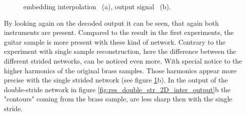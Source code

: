 \begin{figure}[htb!]
    \centering
    \caption{embedding interpolation ~(a), output signal ~(b).}
    \label{fig:res_single_str_2D_inter_output}
\end{figure}

By looking again on the decoded output it can be seen, that again both instruments are present. Compared to the result in the first experiments, the guitar sample is more present with these kind of network. Contrary to the experiment with single sample reconstruction, here the difference between the different strided networks, can be noticed even more. With special notice to the higher harmonics of the original brass samples. Those harmonics appear more precise with the single strided network (see figure \ref{fig:res_single_str_2D_inter_output}b). In the output of the double-stride network in figure \ref{fig:res_double_str_2D_inter_output}b the "contours" coming from the brass sample, are less sharp then with the single stride.

